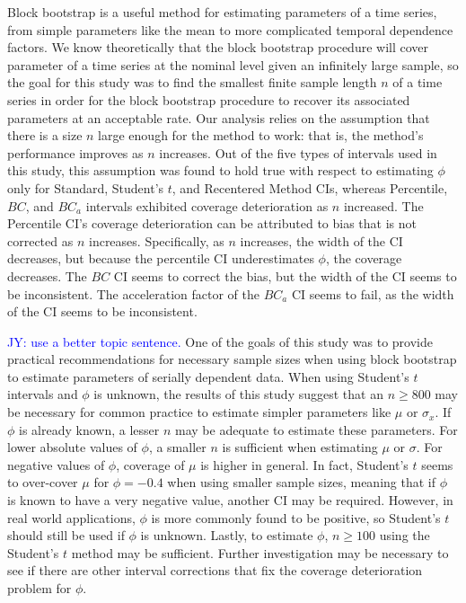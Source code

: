 \documentclass[12pt, letterpaper, titlepage]{article}
\newcommand{\jy}[1]{\textcolor{blue}{JY: #1}}
\begin{document}
Block bootstrap is a useful method for estimating parameters of a time series,
from simple parameters like the mean to more complicated temporal dependence
factors. We know theoretically that the block bootstrap procedure will cover
parameter of a time series at the nominal level given an infinitely large
sample, so the goal for this study was to find the smallest finite sample
length $n$ of a time series in order for the block bootstrap procedure to 
recover its associated parameters at an acceptable rate.
Our analysis relies on the assumption that there is a size $n$ large
enough for the method to work: that is, the method's performance improves as
$n$ increases. Out of the five types of intervals used in this study, this
assumption was found to hold true with respect to estimating $\phi$ only for
Standard, Student's $t$, and Recentered Method CIs, whereas Percentile, $BC$,
and $BC_a$ intervals exhibited coverage deterioration as $n$ increased. The
Percentile CI's coverage deterioration can be attributed to bias that is not
corrected as $n$ increases. Specifically, as $n$ increases, the width of the
CI decreases, but because the percentile CI underestimates $\phi$, the
coverage decreases. The $BC$ CI seems to correct the bias, but the width of
the CI seems to be inconsistent. The acceleration factor of the $BC_a$ CI
seems to fail, as the width of the CI seems to be inconsistent. 


\jy{use a better topic sentence.}
One of the goals of this study was to provide practical recommendations for 
necessary sample sizes when using block bootstrap to estimate parameters of 
serially dependent data. When using Student's $t$ intervals and $\phi$ is unknown,
the results of this study suggest that an $n \geq 800$ may be necessary for common practice to
estimate simpler parameters like $\mu$ or $\sigma_x$. If $\phi$ is already
known, a lesser $n$ may be adequate to estimate these parameters. For lower
absolute values of $\phi$, a smaller $n$ is sufficient when estimating $\mu$
or $\sigma$. For negative values of $\phi$, coverage of $\mu$ is higher in
general. In fact, Student's $t$ seems to over-cover $\mu$ for $\phi = - 0.4$
when using smaller sample sizes, meaning that if $\phi$ is known to have a
very negative value, another CI may be required. However, in real world
applications, $\phi$ is more commonly found to be positive, so Student's $t$
should still be used if $\phi$ is unknown. Lastly, to estimate $\phi$,
$n \geq 100$ using the Student's $t$ method may be sufficient. Further
investigation may be necessary to see if there are other interval corrections
that fix the coverage deterioration problem for $\phi$.
\end{document}
